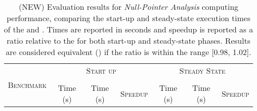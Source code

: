 \begin{table}[H]
	\begin{tabular}{|l|ccc|ccc|}
	\hline
	\multirow{3}{*}{\textsc{Benchmark}} & \multicolumn{3}{c|}{\textsc{Start up}} & \multicolumn{3}{c|}{\textsc{Steady State}} \\ \cline{2-7}
	& \multicolumn{1}{c|}{\intrajbaseline} & \multicolumn{2}{c|}{\intrajrelaxed} & \multicolumn{1}{c|}{\intrajbaseline} & \multicolumn{2}{c|}{\intrajrelaxed} \\ \cline{2-7}
	& \multicolumn{1}{c|}{Time (s)} & \multicolumn{1}{c|}{Time (s)} & \textsc{Speedup} & \multicolumn{1}{c|}{Time (s)} & \multicolumn{1}{c|}{Time (s)} & \textsc{Speedup} \\ \hline
	\end{tabular}
    \caption{\label{tab:npa} (NEW) Evaluation results for \emph{Null-Pointer Analysis} computing performance, comparing the start-up and steady-state execution times of the \intrajbaseline{} and \intrajrelaxed{}. Times are reported in seconds and speedup is reported as a ratio relative to the \intrajbaseline{} for both start-up and steady-state phases. Results are considered equivalent ({\same{}}) if the ratio is within the range [0.98, 1.02].}
    
\end{table}
